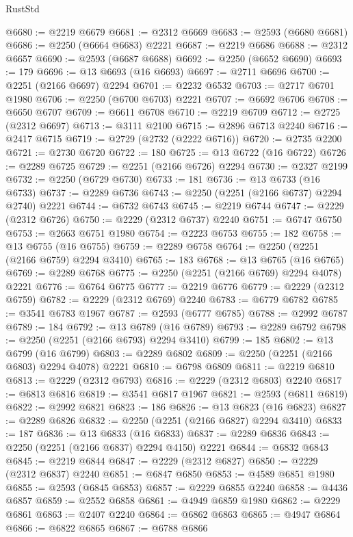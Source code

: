 \begin{lexlean}{RustStd}
\begin{coremodule}
@6680 := @2219 @6679
@6681 := @2312 @6669
@6683 := @2593 (@6680 @6681)
@6686 := @2250 (@6664 @6683) @2221
@6687 := @2219 @6686
@6688 := @2312 @6657
@6690 := @2593 (@6687 @6688)
@6692 := @2250 (@6652 @6690)
@6693 := 179
@6696 := @13 @6693 (@16 @6693)
@6697 := @2711 @6696
@6700 := @2251 (@2166 @6697) @2294
@6701 := @2232 @6532
@6703 := @2717 @6701 @1980
@6706 := @2250 (@6700 @6703) @2221
@6707 := @6692 @6706
@6708 := @6650 @6707
@6709 := @6611 @6708
@6710 := @2219 @6709
@6712 := @2725 (@2312 @6697)
@6713 := @3111 @2100
@6715 := @2896 @6713 @2240
@6716 := @2417 @6715
@6719 := @2729 (@2732 (@2222 @6716))
@6720 := @2735 @2200
@6721 := @2730 @6720
@6722 := 180
@6725 := @13 @6722 (@16 @6722)
@6726 := @2289 @6725
@6729 := @2251 (@2166 @6726) @2294
@6730 := @2327 @2199
@6732 := @2250 (@6729 @6730)
@6733 := 181
@6736 := @13 @6733 (@16 @6733)
@6737 := @2289 @6736
@6743 := @2250 (@2251 (@2166 @6737) @2294 @2740) @2221
@6744 := @6732 @6743
@6745 := @2219 @6744
@6747 := @2229 (@2312 @6726)
@6750 := @2229 (@2312 @6737) @2240
@6751 := @6747 @6750
@6753 := @2663 @6751 @1980
@6754 := @2223 @6753
@6755 := 182
@6758 := @13 @6755 (@16 @6755)
@6759 := @2289 @6758
@6764 := @2250 (@2251 (@2166 @6759) @2294 @3410)
@6765 := 183
@6768 := @13 @6765 (@16 @6765)
@6769 := @2289 @6768
@6775 := @2250 (@2251 (@2166 @6769) @2294 @4078) @2221
@6776 := @6764 @6775
@6777 := @2219 @6776
@6779 := @2229 (@2312 @6759)
@6782 := @2229 (@2312 @6769) @2240
@6783 := @6779 @6782
@6785 := @3541 @6783 @1967
@6787 := @2593 (@6777 @6785)
@6788 := @2992 @6787
@6789 := 184
@6792 := @13 @6789 (@16 @6789)
@6793 := @2289 @6792
@6798 := @2250 (@2251 (@2166 @6793) @2294 @3410)
@6799 := 185
@6802 := @13 @6799 (@16 @6799)
@6803 := @2289 @6802
@6809 := @2250 (@2251 (@2166 @6803) @2294 @4078) @2221
@6810 := @6798 @6809
@6811 := @2219 @6810
@6813 := @2229 (@2312 @6793)
@6816 := @2229 (@2312 @6803) @2240
@6817 := @6813 @6816
@6819 := @3541 @6817 @1967
@6821 := @2593 (@6811 @6819)
@6822 := @2992 @6821
@6823 := 186
@6826 := @13 @6823 (@16 @6823)
@6827 := @2289 @6826
@6832 := @2250 (@2251 (@2166 @6827) @2294 @3410)
@6833 := 187
@6836 := @13 @6833 (@16 @6833)
@6837 := @2289 @6836
@6843 := @2250 (@2251 (@2166 @6837) @2294 @4150) @2221
@6844 := @6832 @6843
@6845 := @2219 @6844
@6847 := @2229 (@2312 @6827)
@6850 := @2229 (@2312 @6837) @2240
@6851 := @6847 @6850
@6853 := @4589 @6851 @1980
@6855 := @2593 (@6845 @6853)
@6857 := @2229 @6855 @2240
@6858 := @4436 @6857
@6859 := @2552 @6858
@6861 := @4949 @6859 @1980
@6862 := @2229 @6861
@6863 := @2407 @2240
@6864 := @6862 @6863
@6865 := @4947 @6864
@6866 := @6822 @6865
@6867 := @6788 @6866

\end{coremodule}
\end{lexlean}
